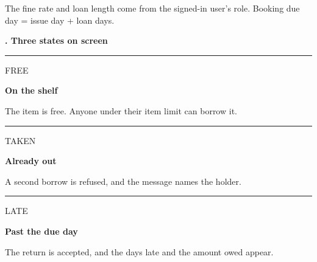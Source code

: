 \documentclass[10pt,a4paper]{article}
\newlength{\secpreskip}
\newcommand{\sechead}[1]{%
  \par\vspace{\secpreskip}%
  \noindent\begin{minipage}{\linewidth}%
    \setlength{\parskip}{0pt}%
    {\cond\bfseries\color{teal}\fontsize{13}{15}\selectfont #1\par}%
    \vspace{0.9mm}{\color{line}\hrule height 0.4pt}%
  \end{minipage}\par\vspace{1.0mm}%
}
\begin{document}
{\fontsize{7.2}{9}\selectfont\color{soft}The fine rate and loan length come from the signed-in user's role. Booking due day = issue day + loan days.\par}

\sechead{5. Three states on screen}
\noindent
\begin{minipage}[t]{0.315\linewidth}
  \setlength{\parskip}{0pt}%
  {\color{teal}\rule{\linewidth}{1.2pt}}\par\vspace{0.6mm}
  {\mono\fontsize{7}{8}\selectfont\color{teal}FREE}\par\vspace{0.6mm}
  {\bfseries\fontsize{9}{10.5}\selectfont On the shelf}\par\vspace{0.5mm}
  {\fontsize{7.4}{9}\selectfont\color{soft}The item is free. Anyone under their item limit can borrow it.}
\end{minipage}\hfill
\begin{minipage}[t]{0.315\linewidth}
  \setlength{\parskip}{0pt}%
  {\color{amber}\rule{\linewidth}{1.2pt}}\par\vspace{0.8mm}
  {\mono\fontsize{7}{8}\selectfont\color{amber}TAKEN}\par\vspace{0.6mm}
  {\bfseries\fontsize{9}{10.5}\selectfont Already out}\par\vspace{0.5mm}
  {\fontsize{7.4}{9}\selectfont\color{soft}A second borrow is refused, and the message names the holder.}
\end{minipage}\hfill
\begin{minipage}[t]{0.315\linewidth}
  \setlength{\parskip}{0pt}%
  {\color{magenta}\rule{\linewidth}{1.2pt}}\par\vspace{0.8mm}
  {\mono\fontsize{7}{8}\selectfont\color{magenta}LATE}\par\vspace{0.6mm}
  {\bfseries\fontsize{9}{10.5}\selectfont Past the due day}\par\vspace{0.5mm}
  {\fontsize{7.4}{9}\selectfont\color{soft}The return is accepted, and the days late and the amount owed appear.}
\end{minipage}

\newpage
\setlength{\secpreskip}{2.6mm}
\end{document}
